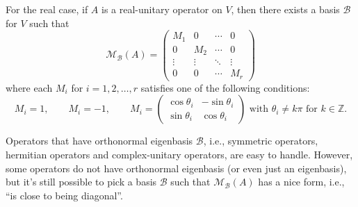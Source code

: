 \documentclass{ctexart}
\newcommand{\Z}{\mathbb{Z}}
\begin{document}
    \begin{mycor}
        For the real case, if $A$ is a real-unitary operator on $V$, then there exists a basis $\mathcal{B}$ for $V$ such that 
        $$\mathcal M_{\mathcal{B}}(A) = \begin{pmatrix}
            M_1 & 0 & \cdots & 0 \\
            0 & M_2 & \cdots & 0 \\
            \vdots & \vdots & \ddots & \vdots \\
            0 & 0 & \cdots & M_r
        \end{pmatrix}$$
        where each $M_i$ for $i=1,2,\ldots,r$ satisfies one of the following conditions:
        $$ M_i = 1,\qquad M_i = -1, \qquad M_i = \begin{pmatrix}
            \cos \theta_i & -\sin \theta_i \\
            \sin \theta_i & \cos \theta_i
        \end{pmatrix} \text{ with } \theta_i \neq k\pi \text{ for } k\in \Z. $$
    \end{mycor}
    \begin{myrmk}
        Operators that have orthonormal eigenbasis $\mathcal B$, i.e., symmetric operators, hermitian operators and complex-unitary operators, are easy to handle. However, some operators do not have orthonormal eigenbasis (or even just an eigenbasis), but it's still possible to pick a basis $\mathcal B$ such that $\mathcal M_{\mathcal B}(A)$ has a nice form, i.e., ``is close to being diagonal''.
    \end{myrmk}
\end{document}
